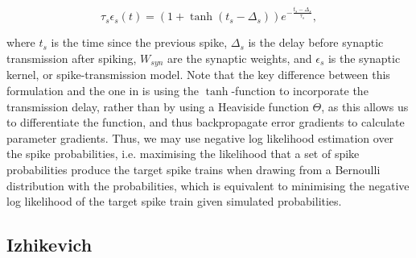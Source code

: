 \documentclass[mphil,deptreport,ianc]{infthesis} %
\begin{document}
\begin{equation}
    \tau_s \epsilon_s(t) = (1 + \tanh(t_{s} - \Delta_s)) e^{-\frac{t_{s} - \Delta_s}{\tau_s}},
\end{equation}

where $t_s$ is the time since the previous spike, $\Delta_s$ is the delay before synaptic transmission after spiking, $W_{syn}$ are the synaptic weights, and $\epsilon_s$ is the synaptic kernel, or spike-transmission model.
Note that the key difference between this formulation and the one in \cite{Rene2020} is using the $\tanh$-function to incorporate the transmission delay, rather than by using a Heaviside function $\Theta$, as this allows us to differentiate the function, and thus backpropagate error gradients to calculate parameter gradients.
Thus, we may use negative log likelihood estimation over the spike probabilities, i.e. maximising the likelihood that a set of spike probabilities produce the target spike trains when drawing from a Bernoulli distribution with the probabilities, which is equivalent to minimising the negative log likelihood of the target spike train given simulated probabilities.







\subsection{Izhikevich}
\end{document}
